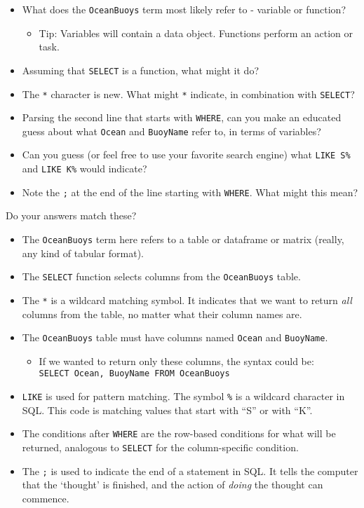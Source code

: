\documentclass[
]{book}
\providecommand{\tightlist}{%
  \setlength{\itemsep}{0pt}\setlength{\parskip}{0pt}}
\begin{document}
\begin{itemize}
\tightlist
\item
  What does the \texttt{OceanBuoys} term most likely refer to - variable or function?

  \begin{itemize}
  \tightlist
  \item
    Tip: Variables will contain a data object. Functions perform an action or task.
  \end{itemize}
\item
  Assuming that \texttt{SELECT} is a function, what might it do?
\item
  The \texttt{*} character is new. What might \texttt{*} indicate, in combination with \texttt{SELECT}?
\item
  Parsing the second line that starts with \texttt{WHERE}, can you make an educated guess about what \texttt{Ocean} and \texttt{BuoyName} refer to, in terms of variables?
\item
  Can you guess (or feel free to use your favorite search engine) what \texttt{LIKE\ \textquotesingle{}S\%\textquotesingle{}} and \texttt{LIKE\ \textquotesingle{}K\%\textquotesingle{}} would indicate?
\item
  Note the \texttt{;} at the end of the line starting with \texttt{WHERE}. What might this mean?
\end{itemize}

Do your answers match these?

\begin{itemize}
\tightlist
\item
  The \texttt{OceanBuoys} term here refers to a table or dataframe or matrix (really, any kind of tabular format).
\item
  The \texttt{SELECT} function selects columns from the \texttt{OceanBuoys} table.
\item
  The \texttt{*} is a wildcard matching symbol. It indicates that we want to return \emph{all} columns from the table, no matter what their column names are.
\item
  The \texttt{OceanBuoys} table must have columns named \texttt{Ocean} and \texttt{BuoyName}.

  \begin{itemize}
  \tightlist
  \item
    If we wanted to return only these columns, the syntax could be: \texttt{SELECT\ Ocean,\ BuoyName\ FROM\ OceanBuoys}
  \end{itemize}
\item
  \texttt{LIKE} is used for pattern matching. The symbol \texttt{\%} is a wildcard character in SQL. This code is matching values that start with ``S'' or with ``K''.
\item
  The conditions after \texttt{WHERE} are the row-based conditions for what will be returned, analogous to \texttt{SELECT} for the column-specific condition.
\item
  The \texttt{;} is used to indicate the end of a statement in SQL. It tells the computer that the `thought' is finished, and the action of \emph{doing} the thought can commence.
\end{itemize}
\end{document}
